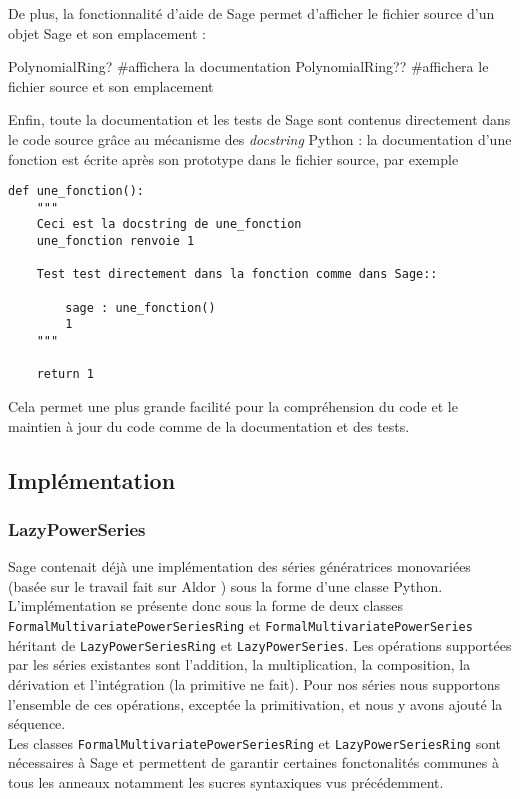 \documentclass[12pt]{article}
\begin{document}
De plus, la fonctionnalité d'aide de Sage permet d'afficher le fichier source
d'un objet Sage et son emplacement :
\begin{sageblock}
PolynomialRing?     #affichera la documentation
PolynomialRing??     #affichera le fichier source et son emplacement
\end{sageblock}
Enfin, toute la documentation et les tests de Sage sont contenus directement dans le code
source grâce au mécanisme des \emph{docstring} Python : la documentation d'une
fonction est écrite après son prototype dans le fichier source, par exemple

\noindent\begin{minipage}{\linewidth}
\begin{lstlisting}
def une_fonction():
    """
    Ceci est la docstring de une_fonction
    une_fonction renvoie 1
    
    Test test directement dans la fonction comme dans Sage::

        sage : une_fonction()
        1
    """

    return 1
\end{lstlisting}
\end{minipage}
Cela permet une plus grande facilité pour la compréhension du code et le
maintien à jour du code comme de la documentation et des tests.


\subsection{Implémentation}

\subsubsection{LazyPowerSeries}
Sage contenait déjà une implémentation des séries génératrices monovariées
(basée sur le travail fait sur Aldor
\cite{Hemmecke+Rubey:Aldor-Combinat:2006}) sous la forme d'une classe
Python. L'implémentation se présente donc sous la forme de deux classes
\verb|FormalMultivariatePowerSeriesRing| et \verb|FormalMultivariatePowerSeries|
héritant de \verb|LazyPowerSeriesRing| et \verb|LazyPowerSeries|. Les
opérations supportées par les séries existantes sont l'addition, la multiplication, la
composition, la dérivation et l'intégration (la primitive ne fait). Pour nos
séries nous supportons l'ensemble de ces opérations, exceptée la
primitivation, et nous y avons ajouté la séquence.\\
Les classes \verb|FormalMultivariatePowerSeriesRing| et
\verb|LazyPowerSeriesRing| sont nécessaires à Sage et permettent de garantir
certaines fonctonalités communes à tous les anneaux notamment les sucres
syntaxiques vus précédemment.
\end{document}
